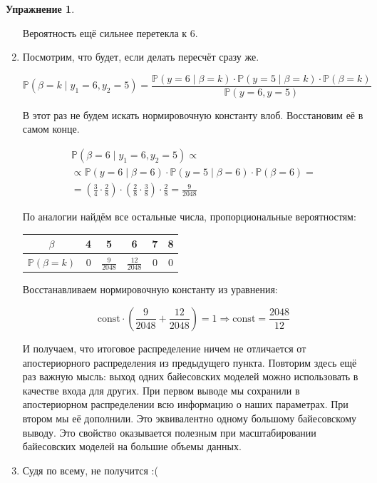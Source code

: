 \documentclass[12pt, a4paper, oneside]{extreport}
\newcommand{\const}{\mathrm{const}}        %
\def \mbb{\mathbb}
\def \PP{\mbb{P}}
\theoremstyle{plain}              %
\theoremstyle{definition}         %
\newtheorem{problem}{\color{myblue} Упражнение}
\begin{document}
\begin{problem}
\begin{sol}
\begin{enumerate}
	Вероятность ещё сильнее перетекла к $6$. 
	
	\item Посмотрим, что будет, если делать пересчёт сразу же. 
	
	\[ \PP(\beta = k \mid y_1 = 6, y_2 = 5) = \frac{\PP(y = 6 \mid \beta = k) \cdot \PP(y = 5 \mid \beta = k) \cdot \PP(\beta = k) }{ \PP(y=6, y=5)}\]
	
	В этот раз не будем искать нормировочную константу влоб. Восстановим её в самом конце. 
	
	\begin{multline*}
	\PP(\beta = 6 \mid y_1 = 6, y_2 = 5) \propto \\ \propto \PP(y = 6 \mid \beta = 6) \cdot \PP(y = 5 \mid \beta = 6) \cdot \PP(\beta = 6) = \\ = \left(\frac{3}{4} \cdot \frac{2}{8} \right)\cdot \left( \frac{2}{8} \cdot \frac{3}{8} \right) \cdot \frac{2}{8} = \frac{9}{2048}
	\end{multline*}
	
	По аналогии найдём все остальные числа, пропорциональные вероятностям: 
	
	\begin{center}
		\begin{tabular}{c|c|c|c|c|c}
			$\beta$ & 4 & 5 & 6 & 7 & 8 \\ \hline
			$\PP(\beta = k)$ & $0 $ & $ \frac{9}{2048}$ &  $ \frac{12}{2048}$ &  $ 0$ &  $0$ \\ 
		\end{tabular}
	\end{center}
	
	Восстанавливаем нормировочную константу из уравнения:
	
	\[ \const \cdot ( \frac{9}{2048} + \frac{12}{2048}) = 1 \Rightarrow \const = \frac{2048}{12} \]
	
	И получаем, что итоговое распределение ничем не отличается от апостериорного распределения из предыдущего пункта.  Повторим здесь ещё раз важную мысль: выход одних байесовских моделей можно использовать в качестве входа для других. При первом выводе мы сохранили в апостериорном распределении всю информацию о наших параметрах. При втором мы её дополнили. Это эквивалентно одному большому байесовскому выводу. Это свойство оказывается полезным при масштабировании байесовских моделей на большие объемы данных. 
	
	\item Судя по всему, не получится :( 
\end{enumerate} 
	\end{sol}
\end{problem}
\end{document}
